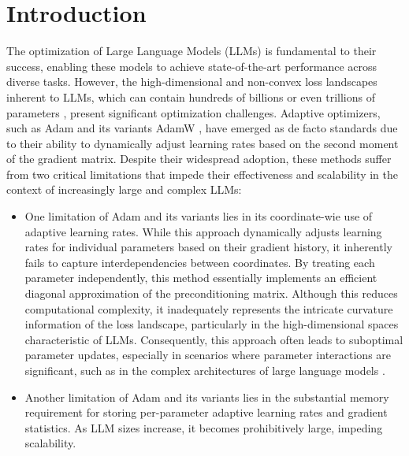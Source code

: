 \section{Introduction}

The optimization of Large Language Models (LLMs) is fundamental to their success, enabling these models to achieve state-of-the-art performance across diverse tasks. However, the high-dimensional and non-convex loss landscapes inherent to LLMs, which can contain hundreds of billions or even trillions of parameters \citep{brown2020language,achiam2023gpt}, present significant optimization challenges. Adaptive optimizers, such as Adam \citep{kingma2014adam} and its variants AdamW \citep{loshchilov2017decoupled}, have emerged as de facto standards due to their ability to dynamically adjust learning rates based on the second moment of the gradient matrix. Despite their widespread adoption, these methods suffer from two critical limitations that impede their effectiveness and scalability in the context of increasingly large and complex LLMs:

\begin{itemize}
\item One limitation of Adam and its variants lies in its coordinate-wie use of adaptive learning rates. While this approach dynamically adjusts learning rates for individual parameters based on their gradient history, it inherently fails to capture interdependencies between coordinates. By treating each parameter independently, this method essentially implements an efficient diagonal approximation of the preconditioning matrix. Although this reduces computational complexity, it inadequately represents the intricate curvature information of the loss landscape, particularly in the high-dimensional spaces characteristic of LLMs. Consequently, this approach often leads to suboptimal parameter updates, especially in scenarios where parameter interactions are significant, such as in the complex architectures of large language models \citep{zhang2024transformers}.

\item Another limitation of Adam and its variants lies in the substantial memory requirement for storing per-parameter adaptive learning rates and gradient statistics. As LLM sizes increase, it becomes prohibitively large, impeding scalability. 
\end{itemize}

